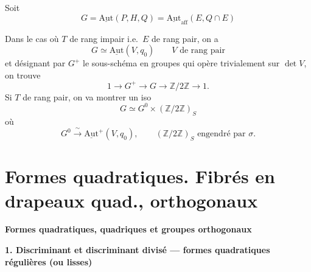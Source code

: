 \documentclass[11pt,a4paper]{article}
\begin{document}
Soit
\[
  G = \underline{\mathrm{Aut}}(P, H, Q) = \underline{\mathrm{Aut}}_{\mathrm{aff}}(E, Q \cap E)
\]


Dans le cas où $T$ de rang impair i.e.\ $E$ de rang pair, on a
\[
  G \simeq \underline{\mathrm{Aut}}(V, q_0) \qquad V \text{ de rang pair}
\]
et désignant par $G^{+}$ le sous-schéma en groupes qui opère trivialement sur
$\det V$, on trouve
\[
  1 \to G^{+} \to G \to \mathbb{Z}/2\mathbb{Z} \to 1 .
\]
Si $T$ de rang pair, \struck{\ill{}} on va montrer  un
iso 
\[
  G \simeq G^{0} \times (\mathbb{Z}/2\mathbb{Z})_S
\]
où
\[
  G^{0} \xrightarrow{\ \sim\ } \underline{\mathrm{Aut}}^{+}(V, q_0),
  \qquad (\mathbb{Z}/2\mathbb{Z})_S \text{ engendré par } \sigma .
\]

\section{Formes quadratiques. Fibrés en drapeaux quad.,  orthogonaux}

\textbf{Formes quadratiques, quadriques et groupes orthogonaux}

\textbf{1. Discriminant et discriminant divisé — formes quadratiques régulières
(ou lisses)}
\end{document}
